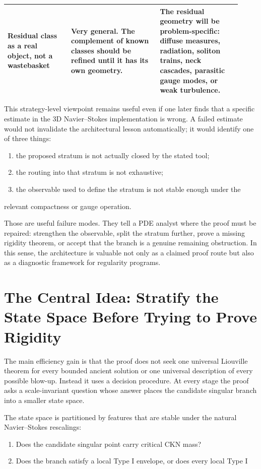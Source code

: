 \documentclass[11pt]{amsart}
\begin{document}
\begin{longtable}{@{}>{\raggedright\arraybackslash}p{0.25\linewidth}>{\raggedright\arraybackslash}p{0.35\linewidth}>{\raggedright\arraybackslash}p{0.32\linewidth}@{}}
Residual class as a real object, not a wastebasket & Very general.  The complement of known classes should be refined until it has its own geometry. & The residual geometry will be problem-specific: diffuse measures, radiation, soliton trains, neck cascades, parasitic gauge modes, or weak turbulence. \\
\bottomrule
\end{longtable}

This strategy-level viewpoint remains useful even if one later finds that a specific estimate in the 3D Navier--Stokes implementation is wrong.  A failed estimate would not invalidate the architectural lesson automatically; it would identify one of three things:

\begin{enumerate}
\item the proposed stratum is not actually closed by the stated tool;
\item the routing into that stratum is not exhaustive;
\item the observable used to define the stratum is not stable enough under the
\end{enumerate}

relevant compactness or gauge operation.

Those are useful failure modes.  They tell a PDE analyst where the proof must be repaired: strengthen the observable, split the stratum further, prove a missing rigidity theorem, or accept that the branch is a genuine remaining obstruction.  In this sense, the architecture is valuable not only as a claimed proof route but also as a diagnostic framework for regularity programs.

\section{The Central Idea: Stratify the State Space Before Trying to Prove Rigidity}

The main efficiency gain is that the proof does not seek one universal Liouville theorem for every bounded ancient solution or one universal description of every possible blow-up.  Instead it uses a decision procedure. At every stage the proof asks a scale-invariant question whose answer places the candidate singular branch into a smaller state space.

The state space is partitioned by features that are stable under the natural Navier--Stokes rescalings:

\begin{enumerate}
\item Does the candidate singular point carry critical CKN mass?
\item Does the branch satisfy a local Type I envelope, or does every local Type I
\end{enumerate}
\end{document}
